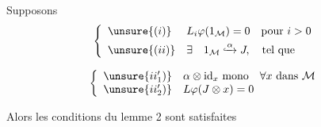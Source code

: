Supposons
\[
\left\{\begin{array}{ll}
\unsure{(i)}&L_i\varphi(1_{\mathcal M})=0\quad\text{pour }i>0\\[4pt]
\unsure{(ii)}&\exists\quad 1_{\mathcal M}\lhook\joinrel\xrightarrow{\alpha}J,
\quad\text{tel que}
\end{array}\right.
\]

\[
\left\{\begin{array}{ll}
\unsure{ii'_1)}&\alpha\otimes\mathrm{id}_x\text{ mono}\quad\forall x\text{ dans }\mathcal M\\
\unsure{ii'_2)}&L\varphi(J\otimes x)=0
\end{array}\right.
\]

Alors  les conditions du lemme 2 sont satisfaites

